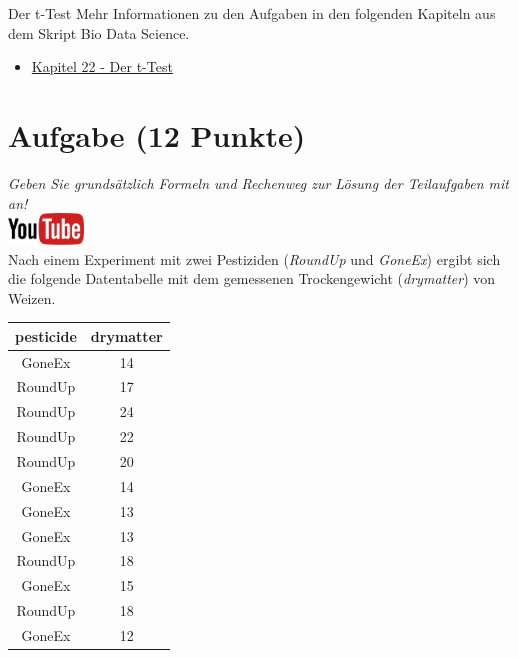 \documentclass[a4paper, 9pt]{scrartcl}\usepackage[]{graphicx}\usepackage[]{xcolor}
\begin{document}
\clearpage
\begin{graybox}{Der t-Test}
Mehr Informationen zu den Aufgaben in den folgenden Kapiteln aus dem Skript Bio Data Science.
  \begin{itemize}
  \item \href{https://jkruppa.github.io/stat-tests-ttest.html}{Kapitel 22 - Der t-Test}
  \end{itemize}
\end{graybox}
\clearpage

\section{Aufgabe \hfill (12 Punkte)}

\textit{Geben Sie grunds{\"a}tzlich Formeln und Rechenweg zur L{\"o}sung der
  Teilaufgaben mit an!} \\[1Ex]

\hfill\href{https://youtu.be/Cq_rF_z4xOk}{\includegraphics[width =
  2cm]{img/youtube}}\\[1Ex]

Nach einem Experiment mit zwei Pestiziden (\textit{RoundUp} und
\textit{GoneEx}) ergibt sich die folgende Datentabelle mit dem gemessenen
Trockengewicht (\textit{drymatter}) von Weizen.

\begin{table}[!h]
\centering
\begin{tabular}{cc}
\toprule
pesticide & drymatter\\
\midrule
GoneEx & 14\\
RoundUp & 17\\
RoundUp & 24\\
RoundUp & 22\\
RoundUp & 20\\
\addlinespace
GoneEx & 14\\
GoneEx & 13\\
GoneEx & 13\\
RoundUp & 18\\
GoneEx & 15\\
\addlinespace
RoundUp & 18\\
GoneEx & 12\\
\bottomrule
\end{tabular}
\end{table}
\end{document}
